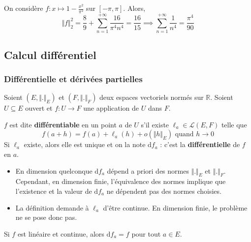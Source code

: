   \begin{example}
    On considère $f : x \mapsto 1 - \frac{x^2}{\pi^2}$ sur $[-\pi, \pi]$. Alors,
    \[ \Vert f \Vert^2_2 = \frac{8}{9} + \sum_{n=1}^{+\infty} \frac{16}{\pi^4 n^4} = \frac{16}{15} \implies \sum_{n=1}^{+\infty} \frac{1}{n^4} = \frac{\pi^4}{90} \]
  \end{example}

  \subsection{Calcul différentiel}

  \subsubsection{Différentielle et dérivées partielles}


  Soient $(E, \Vert . \Vert_E)$ et $(F, \Vert . \Vert_F)$ deux espaces vectoriels normés sur $\mathbb{R}$. Soient $U \subseteq E$ ouvert et $f : U \rightarrow F$ une application de $U$ dans $F$.

  \begin{definition}
    $f$ est dite \textbf{différentiable} en un point $a$ de $U$ s'il existe $\ell_a \in \mathcal{L}(E,F)$ telle que
    \[ f(a+h) = f(a) + \ell_a(h) + o(\Vert h \Vert_E) \text{ quand } h \longrightarrow 0 \]
    Si $\ell_a$ existe, alors elle est unique et on la note $\mathrm{d}f_a$ : c'est la \textbf{différentielle} de $f$ en $a$.
  \end{definition}

  \begin{remark}
    \begin{itemize}
      \item En dimension quelconque $\mathrm{d}f_a$ dépend a priori des normes $\Vert . \Vert_E$ et $\Vert . \Vert_F$. Cependant, en dimension finie, l'équivalence des normes implique que l'existence et la valeur de $\mathrm{d}f_a$ ne dépendent pas des normes choisies.
      \item La définition demande à $\ell_a$ d'être continue. En dimension finie, le problème ne se pose donc pas.
    \end{itemize}
  \end{remark}

  \begin{example}
    Si $f$ est linéaire et continue, alors $\mathrm{d}f_a = f$ pour tout $a \in E$.
  \end{example}

